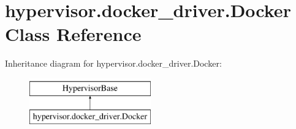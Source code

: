 \hypertarget{classhypervisor_1_1docker__driver_1_1Docker}{\section{hypervisor.\-docker\-\_\-driver.\-Docker Class Reference}
\label{classhypervisor_1_1docker__driver_1_1Docker}
}
Inheritance diagram for hypervisor.\-docker\-\_\-driver.\-Docker\-:\begin{figure}[H]
\begin{center}
\leavevmode
\includegraphics[height=2.000000cm]{classhypervisor_1_1docker__driver_1_1Docker}
\end{center}
\end{figure}
